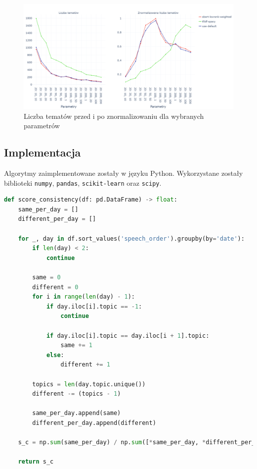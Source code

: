 		\begin{figure}[htb]
			\centering
			\includegraphics[width=\linewidth]{rys05/topic_counts.png}
			\caption{Liczba tematów przed i po znormalizowaniu dla wybranych parametrów}\label{fig:topic_counts}
		\end{figure}

	\subsection{Implementacja}
		Algorytmy zaimplementowane zostały w języku Python.
		Wykorzystane zostały biblioteki \verb|numpy|, \verb|pandas|, \verb|scikit-learn| oraz \verb|scipy|.

		\begin{lstlisting}[label=lst:score_consistency,language=Python,caption=Funkcja obliczająca spójność s\_c]
def score_consistency(df: pd.DataFrame) -> float:
	same_per_day = []
	different_per_day = []

	for _, day in df.sort_values('speech_order').groupby(by='date'):
		if len(day) < 2:
			continue

		same = 0
		different = 0
		for i in range(len(day) - 1):
			if day.iloc[i].topic == -1:
				continue

			if day.iloc[i].topic == day.iloc[i + 1].topic:
				same += 1
			else:
				different += 1

		topics = len(day.topic.unique())
		different -= (topics - 1)

		same_per_day.append(same)
		different_per_day.append(different)

	s_c = np.sum(same_per_day) / np.sum([*same_per_day, *different_per_day])

	return s_c
		\end{lstlisting}

